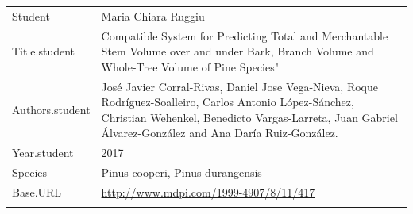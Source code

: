 \documentclass[]{article}
\begin{document}
\begin{longtable}[]{@{}ll@{}}
\toprule
\endhead
\begin{minipage}[t]{0.21\columnwidth}\raggedright
Student\strut
\end{minipage} & \begin{minipage}[t]{0.73\columnwidth}\raggedright
Maria Chiara Ruggiu\strut
\end{minipage}\tabularnewline
\begin{minipage}[t]{0.21\columnwidth}\raggedright
Title.student\strut
\end{minipage} & \begin{minipage}[t]{0.73\columnwidth}\raggedright
Compatible System for Predicting Total and Merchantable Stem Volume over
and under Bark, Branch Volume and Whole-Tree Volume of Pine
Species"\strut
\end{minipage}\tabularnewline
\begin{minipage}[t]{0.21\columnwidth}\raggedright
Authors.student\strut
\end{minipage} & \begin{minipage}[t]{0.73\columnwidth}\raggedright
José Javier Corral-Rivas, Daniel Jose Vega-Nieva, Roque
Rodríguez-Soalleiro, Carlos Antonio López-Sánchez, Christian Wehenkel,
Benedicto Vargas-Larreta, Juan Gabriel Álvarez-González and Ana Daría
Ruiz-González.\strut
\end{minipage}\tabularnewline
\begin{minipage}[t]{0.21\columnwidth}\raggedright
Year.student\strut
\end{minipage} & \begin{minipage}[t]{0.73\columnwidth}\raggedright
2017\strut
\end{minipage}\tabularnewline
\begin{minipage}[t]{0.21\columnwidth}\raggedright
Species\strut
\end{minipage} & \begin{minipage}[t]{0.73\columnwidth}\raggedright
Pinus cooperi, Pinus durangensis\strut
\end{minipage}\tabularnewline
\begin{minipage}[t]{0.21\columnwidth}\raggedright
Base.URL\strut
\end{minipage} & \begin{minipage}[t]{0.73\columnwidth}\raggedright
\url{http://www.mdpi.com/1999-4907/8/11/417}\strut
\end{minipage}\tabularnewline
\begin{minipage}[t]{0.21\columnwidth}\raggedright

\end{minipage}
\end{longtable}
\end{document}
